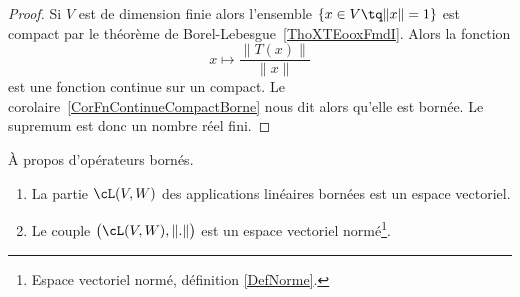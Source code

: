 \begin{proof}
	Si \( V\) est de dimension finie alors l'ensemble \( \{ x\in V \tq \| x \|= 1 \}\) est compact par le théorème de Borel-Lebesgue~\ref{ThoXTEooxFmdI}. Alors la fonction
	\begin{equation}
		x\mapsto \frac{ \| T(x) \| }{ \| x \| }
	\end{equation}
	est une fonction continue sur un compact. Le corolaire~\ref{CorFnContinueCompactBorne} nous dit alors qu'elle est bornée. Le supremum est donc un nombre réel fini.
\end{proof}

\begin{proposition}	\label{PROPooZBJXooNDsqax}
	À propos d'opérateurs bornés.
	\begin{enumerate}
		\item
		      La partie \( \cL(V,W)\) des applications linéaires bornées est un espace vectoriel.
		\item
		      Le couple \( \big( \cL(V,W),\| . \| \big)\) est un espace vectoriel normé\footnote{Espace vectoriel normé, définition \ref{DefNorme}.}.
	\end{enumerate}
\end{proposition}

